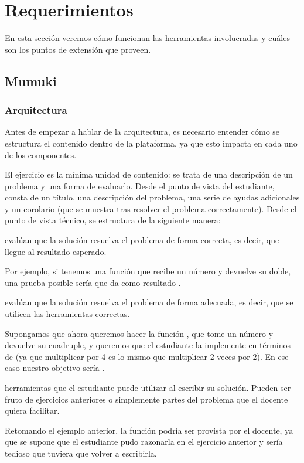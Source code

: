 
\section{Requerimientos}
En esta sección veremos cómo funcionan las herramientas involucradas y cuáles son los puntos de extensión que proveen.

\subsection{Mumuki}

\subsubsection{Arquitectura}
Antes de empezar a hablar de la arquitectura, es necesario entender cómo se estructura el contenido dentro de la plataforma, ya que esto impacta en cada uno de los componentes.

El ejercicio es la mínima unidad de contenido: se trata de una descripción de un problema y una forma de evaluarlo. Desde el punto de vista del estudiante, consta de un título, una descripción del problema, una serie de ayudas adicionales y un corolario (que se muestra tras resolver el problema correctamente). Desde el punto de vista técnico, se estructura de la siguiente manera:

\begin{itemize}
   evalúan que la solución resuelva el problema de forma correcta, es decir, que llegue al resultado esperado.

  Por ejemplo, si tenemos una función  que recibe un número y devuelve su doble, una prueba posible sería que  da como resultado .

   evalúan que la solución resuelva el problema de forma adecuada, es decir, que se utilicen las herramientas correctas.

  Supongamos que ahora queremos hacer la función , que tome un número y devuelve su cuadruple, y queremos que el estudiante la implemente en términos de  (ya que multiplicar por 4 es lo mismo que multiplicar 2 veces por 2). En ese caso nuestro objetivo sería .

   herramientas que el estudiante puede utilizar al escribir su solución. Pueden ser fruto de ejercicios anteriores o simplemente partes del problema que el docente quiera facilitar.

  Retomando el ejemplo anterior, la función  podría ser provista por el docente, ya que se supone que el estudiante pudo razonarla en el ejercicio anterior y sería tedioso que tuviera que volver a escribirla.
\end{itemize}

